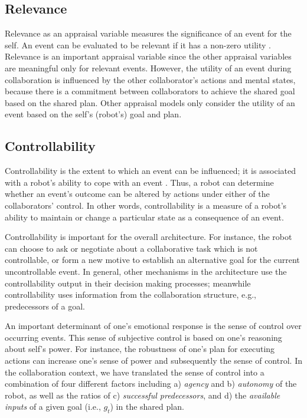 \documentclass{sig-alternate-05-2015}
\begin{document}
\subsection{Relevance}

Relevance as an appraisal variable measures the significance of an event for the
self. An event can be evaluated to be relevant if it has a non-zero utility
\cite{marsella:ema-process-model}. Relevance is an important appraisal variable
since the other appraisal variables are meaningful only for relevant events.
However, the utility of an event during collaboration is influenced by the other
collaborator's actions and mental states, because there is a commitment between
collaborators to achieve the shared goal based on the shared plan. Other
appraisal models only consider the utility of an event based on the self's
(robot's) goal and plan.

\subsection{Controllability}
Controllability is the extent to which an event can be influenced; it is
associated with a robot's ability to cope with an event
\cite{gratch:domain-independent}. Thus, a robot can determine whether an event's
outcome can be altered by actions under either of the collaborators' control. In
other words, controllability is a measure of a robot's ability to maintain or
change a particular state as a consequence of an event.

Controllability is important for the overall architecture. For instance, the
robot can choose to ask or negotiate about a collaborative task which is not
controllable, or form a new motive to establish an alternative goal for the
current uncontrollable event. In general, other mechanisms in the architecture
use the controllability output in their decision making processes; meanwhile
controllability uses information from the collaboration structure, e.g.,
predecessors of a goal.

An important determinant of one's emotional response is the sense of control
over occurring events. This sense of subjective control is based on one's
reasoning about self's power. For instance, the robustness of one's plan for
executing actions can increase one's sense of power and subsequently the sense
of control. In the collaboration context, we have translated the sense of control
into a combination of four different factors including a) \textit{agency} and b)
\textit{autonomy} of the robot, as well as the ratios of c) \textit{successful
predecessors}, and d) the \textit{available inputs} of a given goal
(i.e., $\mathit{g}_{t}$) in the shared plan.
\end{document}
